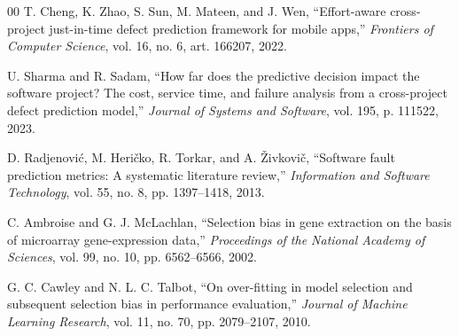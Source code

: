 \documentclass[conference,a4paper]{IEEEtran}
\begin{document}
\begin{thebibliography}{00}
 T. Cheng, K. Zhao, S. Sun, M. Mateen, and J. Wen, ``Effort-aware cross-project just-in-time defect prediction framework for mobile apps,'' \textit{Frontiers of Computer Science}, vol. 16, no. 6, art. 166207, 2022.

 U. Sharma and R. Sadam, ``How far does the predictive decision impact the software project? The cost, service time, and failure analysis from a cross-project defect prediction model,'' \textit{Journal of Systems and Software}, vol. 195, p. 111522, 2023.

 D. Radjenovi{\'c}, M. Heri{\v c}ko, R. Torkar, and A. {\v Z}ivkovi{\v c}, ``Software fault prediction metrics: A systematic literature review,'' \textit{Information and Software Technology}, vol. 55, no. 8, pp. 1397--1418, 2013.

 C. Ambroise and G. J. McLachlan, ``Selection bias in gene extraction on the basis of microarray gene-expression data,'' \textit{Proceedings of the National Academy of Sciences}, vol. 99, no. 10, pp. 6562--6566, 2002.

 G. C. Cawley and N. L. C. Talbot, ``On over-fitting in model selection and subsequent selection bias in performance evaluation,'' \textit{Journal of Machine Learning Research}, vol. 11, no. 70, pp. 2079--2107, 2010.

\end{thebibliography}
\end{document}
